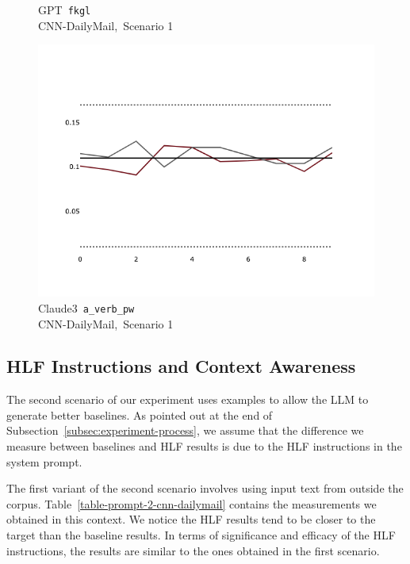 \documentclass[a4paper,twoside]{article}
\begin{document}
\begin{figure}[ht!]
\begin{minipage}{0.32\textwidth}
        \caption{GPT~\texttt{fkgl}\\CNN-DailyMail,~Scenario 1}\label{fig-gpt-fkgl}
    \end{minipage}
    \hfill
    \begin{minipage}{0.32\textwidth}
        \includegraphics[width=\linewidth]{plots/prompt_1/prompt_1-claude3-cnn_dailymail/prompt_1-claude3-cnn_dailymail_a_verb_pw.png}
        \caption[center]{Claude3~\texttt{a\_verb\_pw}\\CNN-DailyMail,~Scenario 1}\label{fig-claude3-avpw}
    \end{minipage}
\end{figure}

\subsection{HLF Instructions and Context Awareness}

The second scenario of our experiment uses examples to allow the LLM to
generate better baselines.
As pointed out at the end of Subsection~\ref{subsec:experiment-process}, we
assume that the difference we measure between baselines and HLF results is due
to the HLF instructions in the system prompt.

The first variant of the second scenario involves using input text from outside
the corpus.
Table~\ref{table-prompt-2-cnn-dailymail} contains the measurements we obtained
in this context.
We notice the HLF results tend to be closer to the target than the baseline
results.
In terms of significance and efficacy of the HLF instructions, the results are
similar to the ones obtained in the first scenario. 
\end{document}
